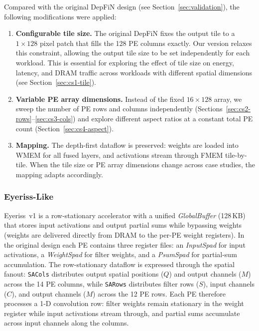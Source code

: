 Compared with the original DepFiN design (see
Section~\ref{sec:validation}), the following modifications were applied:

\begin{enumerate}
  \item \textbf{Configurable tile size.}
        The original DepFiN fixes the output tile to a $1 \times 128$
        pixel patch that fills the 128 PE columns exactly.
        Our version relaxes this constraint, allowing the output tile
        size to be set independently for each workload.
        This is essential for exploring the effect of tile size on
        energy, latency, and DRAM traffic across workloads with
        different spatial dimensions (see Section~\ref{sec:cs1-tile}).

  \item \textbf{Variable PE array dimensions.}
        Instead of the fixed $16 \times 128$ array, we sweep the number
        of PE rows and columns independently
        (Sections~\ref{sec:cs2-rows}--\ref{sec:cs3-cols})
        and explore different aspect ratios at a constant total PE count
        (Section~\ref{sec:cs4-aspect}).

  \item \textbf{Mapping.}
        The depth-first dataflow is preserved: weights are loaded into
        WMEM for all fused layers, and activations stream through FMEM
        tile-by-tile.
        When the tile size or PE array dimensions change across case
        studies, the mapping adapts accordingly.
\end{enumerate}

\subsubsection{Eyeriss-Like}
\label{sec:eyeriss-like}

Eyeriss~v1 is a row-stationary accelerator with a unified
\emph{GlobalBuffer} (128\,KB) that stores input activations and output
partial sums while bypassing weights (weights are delivered directly
from DRAM to the per-PE weight registers).
In the original design each PE contains three register files:
an \emph{InputSpad} for input activations,
a \emph{WeightSpad} for filter weights,
and a \emph{PsumSpad} for partial-sum accumulation.
The row-stationary dataflow is expressed through the spatial fanout:
\texttt{SACols} distributes output spatial positions ($Q$) and output
channels ($M$) across the 14 PE columns, while \texttt{SARows}
distributes filter rows ($S$), input channels ($C$), and output channels
($M$) across the 12 PE rows.
Each PE therefore processes a 1-D convolution row: filter weights remain
stationary in the weight register while input activations stream through,
and partial sums accumulate across input channels along the columns.

